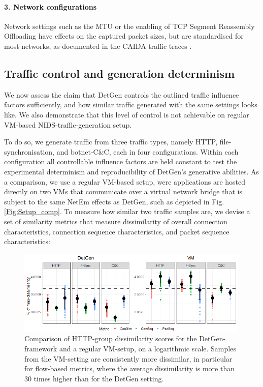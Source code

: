 \documentclass[runningheads]{llncs}
\begin{document}
\paragraph{3. Network configurations}
Network settings such as the MTU or the enabling of TCP Segment Reassembly Offloading have effects on the captured packet sizes, but are standardised for most networks, as documented in the CAIDA traffic traces \cite{walsworth2015caida}.


\subsection{Traffic control and generation determinism}\label{Sec:Determinism}
We now assess the claim that DetGen controls the outlined traffic influence factors sufficiently, and how similar traffic generated with the same settings looks like. We also demonstrate that this level of control is not achievable on regular VM-based NIDS-traffic-generation setup.

To do so, we generate traffic from three traffic types, namely HTTP, file-synchronisation, and botnet-C\&C, each in four configurations. Within each configuration all controllable influence factors are held constant to test the experimental determinism and reproducibility of DetGen's generative abilities. 
As a comparison, we use a regular VM-based setup, were applications are hosted directly on two VMs that communicate over a virtual network bridge that is subject to the same NetEm effects as DetGen, such as depicted in Fig. \ref{Fig:Setup_comp}. To measure how similar two traffic samples are, we devise a set of similarity metrics that measure dissimilarity of overall connection characteristics, connection sequence characteristics, and packet sequence characteristics:


\begin{figure}
\centering
\includegraphics[width=0.99\textwidth]{images/Exp111.png}
\caption{Comparison of HTTP-group dissimilarity scores for the DetGen-framework and a regular VM-setup, on a logarithmic scale. Samples from the VM-setting are consistently more dissimilar, in particular for flow-based metrics, where the average dissimilarity is more than 30 times higher than for the DetGen setting.}\label{Fig:determ-metric}
\end{figure}
\end{document}
